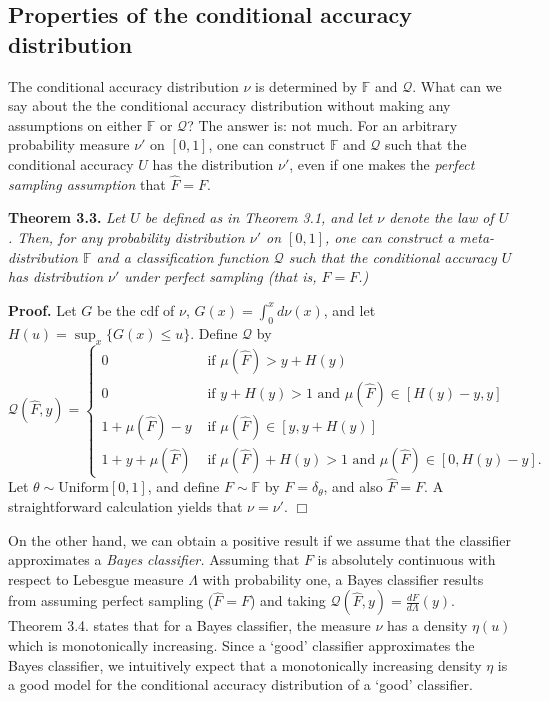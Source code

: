 \documentclass[12pt]{article}
\begin{document}
\subsection{Properties of the conditional accuracy distribution}

The conditional accuracy distribution $\nu$ is determined by $\mathbb{F}$
and $\mathcal{Q}$.  What can we say about the the conditional accuracy
distribution without making any assumptions on either $\mathbb{F}$ or
$\mathcal{Q}$?  The answer is: not much.  For an arbitrary probability
measure $\nu'$ on $[0,1]$, one can construct $\mathbb{F}$ and
$\mathcal{Q}$ such that the conditional accuracy $U$ has the distribution $\nu'$, even if one makes the \emph{perfect sampling assumption} that $\hat{F}=F.$

\noindent\textbf{Theorem 3.3.} \emph{ Let $U$ be defined as in Theorem
  3.1, and let $\nu$ denote the law of $U$.  Then, for any probability
  distribution $\nu'$ on $[0,1]$, one can construct a
  meta-distribution $\mathbb{F}$ and a classification function $\mathcal{Q}$ such
  that the conditional accuracy $U$ has distribution $\nu'$ under perfect sampling (that is, $\hat{F} = F$.)  }

\textbf{Proof.}  
Let $G$ be the cdf of $\nu$, $G(x) = \int_0^x d\nu(x)$, and let $H(u) = \sup_x \{G(x) \leq u\}$.
Define $\mathcal{Q}$ by
\[
\mathcal{Q}(\hat{F}, y) = \begin{cases}
0 &\text{ if }\mu(\hat{F}) > y + H(y)\\
0 & \text{ if }y + H(y) > 1 \text{ and }\mu(\hat{F}) \in [H(y) - y, y]\\
1 + \mu(\hat{F}) - y &\text{ if } \mu(\hat{F}) \in [y, y + H(y)]\\
1 + y + \mu(\hat{F}) &\text{ if }\mu(\hat{F}) + H(y) > 1 \text{ and }\mu(\hat{F}) \in [0, H(y) - y]. 
\end{cases}
\]
Let $\theta \sim \text{Uniform}[0,1]$,
and define $F \sim \mathbb{F}$ by $F = \delta_\theta$, and also $\hat{F} = F.$
A straightforward calculation yields that $\nu = \nu'$. $\Box$

On the other hand, we can obtain a positive result if we assume that
the classifier approximates a \emph{Bayes classifier.}
Assuming that $F$ is absolutely continuous with respect to Lebesgue measure $\Lambda$ with probability one,
a Bayes classifier results from assuming perfect sampling ($\hat{F} = F$) and taking
$\mathcal{Q}(\hat{F}, y) = \frac{dF}{d\Lambda}(y)$.
Theorem 3.4. states that for a Bayes classifier, the measure $\nu$ has a density $\eta(u)$ which is monotonically increasing.
Since a `good' classifier approximates the Bayes classifier, we intuitively expect that a monotonically
increasing density $\eta$ is a good model for the conditional accuracy distribution of a `good' classifier.
\end{document}
